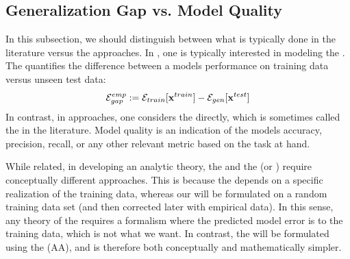 
\subsection{Generalization Gap vs. Model Quality}
\label{sxn:SMOG_main-model_quality}

In this subsection, we should distinguish between what is typically done in the \SLT literature versus the \STATMECH approaches.
In \SLT, one is typically interested in modeling the \emph{\GeneralizationGap}.
The \GeneralizationGap quantifies the difference between a models performance on training data versus unseen test data:
\begin{align}
  \label{eqn:gen_gap}
  \mathcal{E}^{emp}_{gap}:= {\mathcal{E}}_{train}[\mathbf{x}^{train}]- {\mathcal{E}}_{gen}[\mathbf{x}^{test}]
\end{align}
In contrast, in \STATMECH approaches, one considers the \ModelGeneralizationError directly,
which is sometimes called the \ModelQuality in the \SLT literature.
Model quality is an indication of the models accuracy, precision, recall, or any other relevant metric based on the task at hand.

While related, in developing an analytic theory, the \GeneralizationGap and
the \ModelQuality (or \ModelGeneralizationError) require conceptually different approaches.
This is because the  \GeneralizationGap depends on a specific realization of the training data,
whereas our \ModelGeneralizationError will be formulated on a random training data set
(and then corrected later with empirical data).
In this sense, any theory of the \GeneralizationGap  requires a formalism where the
predicted model error is \Quenched to the training data, which is not what we want.
In contrast, the \ModelGeneralizationError  will be formulated using the \AnnealedApproximation (AA),
and is therefore both conceptually and mathematically simpler.


